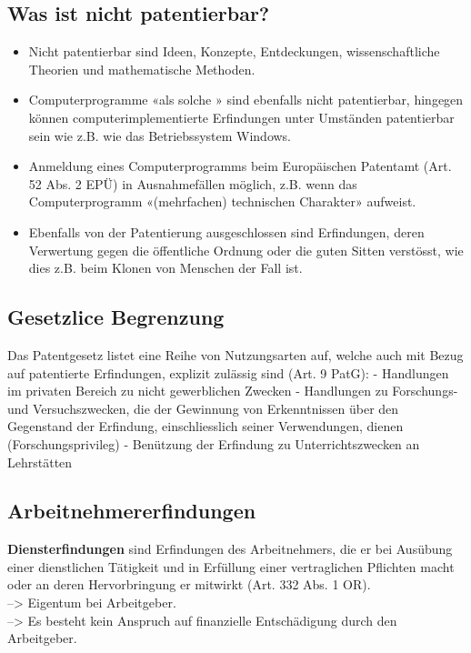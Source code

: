 \hypertarget{was-ist-nicht-patentierbar}{%
\subsection{Was ist nicht
patentierbar?}\label{was-ist-nicht-patentierbar}}

\begin{itemize}
\tightlist
\item
  Nicht patentierbar sind Ideen, Konzepte, Entdeckungen,
  wissenschaftliche Theorien und mathematische Methoden.
\item
  Computerprogramme «als solche » sind ebenfalls nicht patentierbar,
  hingegen können computerimplementierte Erfindungen unter Umständen
  patentierbar sein wie z.B. wie das Betriebssystem Windows.
\item
  Anmeldung eines Computerprogramms beim Europäischen Patentamt (Art. 52
  Abs. 2 EPÜ) in Ausnahmefällen möglich, z.B. wenn das Computerprogramm
  «(mehrfachen) technischen Charakter» aufweist.
\item
  Ebenfalls von der Patentierung ausgeschlossen sind Erfindungen, deren
  Verwertung gegen die öffentliche Ordnung oder die guten Sitten
  verstösst, wie dies z.B. beim Klonen von Menschen der Fall ist.
\end{itemize}

\hypertarget{gesetzlice-begrenzung}{%
\subsection{Gesetzlice Begrenzung}\label{gesetzlice-begrenzung}}

Das Patentgesetz listet eine Reihe von Nutzungsarten auf, welche auch
mit Bezug auf patentierte Erfindungen, explizit zulässig sind (Art. 9
PatG): - Handlungen im privaten Bereich zu nicht gewerblichen Zwecken -
Handlungen zu Forschungs- und Versuchszwecken, die der Gewinnung von
Erkenntnissen über den Gegenstand der Erfindung, einschliesslich seiner
Verwendungen, dienen (Forschungsprivileg) - Benützung der Erfindung zu
Unterrichtszwecken an Lehrstätten

\hypertarget{arbeitnehmererfindungen}{%
\subsection{Arbeitnehmererfindungen}\label{arbeitnehmererfindungen}}

\textbf{Diensterfindungen} sind Erfindungen des Arbeitnehmers, die er
bei Ausübung einer dienstlichen Tätigkeit und in Erfüllung einer
vertraglichen Pflichten macht oder an deren Hervorbringung er mitwirkt
(Art. 332 Abs. 1 OR).\\
--\textgreater{} Eigentum bei Arbeitgeber.\\
--\textgreater{} Es besteht kein Anspruch auf finanzielle Entschädigung
durch den Arbeitgeber.

